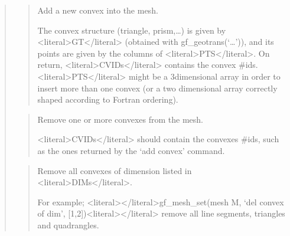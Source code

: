 \documentclass[a4paper,11pt,english]{sphinxmanual}
\begin{document}
\begin{quote}
\sphinxAtStartPar
{}
\begin{quote}

\sphinxAtStartPar
Add a new convex into the mesh.

\sphinxAtStartPar
The convex structure (triangle, prism,…) is given by \textless{}literal\textgreater{}GT\textless{}/literal\textgreater{}
(obtained with gf\_geotrans(‘…’)), and its points are given by
the columns of \textless{}literal\textgreater{}PTS\textless{}/literal\textgreater{}. On return, \textless{}literal\textgreater{}CVIDs\textless{}/literal\textgreater{} contains the convex \#ids.
\textless{}literal\textgreater{}PTS\textless{}/literal\textgreater{} might be a 3\sphinxhyphen{}dimensional array in order to insert more than
one convex (or a two dimensional array correctly shaped according
to Fortran ordering).
\end{quote}

\sphinxAtStartPar
{}
\begin{quote}

\sphinxAtStartPar
Remove one or more convexes from the mesh.

\sphinxAtStartPar
\textless{}literal\textgreater{}CVIDs\textless{}/literal\textgreater{} should contain the convexes \#ids, such as the ones
returned by the ‘add convex’ command.
\end{quote}

\sphinxAtStartPar
{}
\begin{quote}

\sphinxAtStartPar
Remove all convexes of dimension listed in \textless{}literal\textgreater{}DIMs\textless{}/literal\textgreater{}.

\sphinxAtStartPar
For example; \textless{}literal\textgreater{}\textless{}/literal\textgreater{}gf\_mesh\_set(mesh M, ‘del convex of dim’, {[}1,2{]})\textless{}literal\textgreater{}\textless{}/literal\textgreater{} remove
all line segments, triangles and quadrangles.
\end{quote}

\sphinxAtStartPar
{}
\begin{quote}


\end{quote}
\end{quote}
\end{document}
